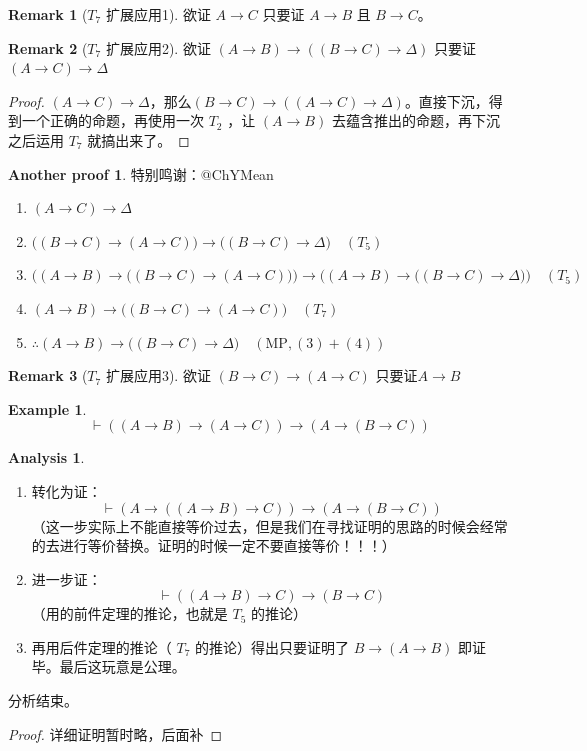 \documentclass[oneside]{book}
\theoremstyle{definition}
\newtheorem{example}{Example}[section]
\newtheorem{remark}{Remark}[section]
\newtheorem*{ap}{Another proof}
\newtheorem*{analysis}{Analysis}
\begin{document}
\begin{remark}[$T_7$ 扩展应用1]
欲证 $A \to C$
	只要证 $A \to B$ 且 $B \to C$。
\end{remark}
\begin{remark}[$T_7$ 扩展应用2]
	欲证 $(A \to B) \to \left( (B \to C) \to \Delta \right)$
	只要证$(A \to C) \to \Delta$
\end{remark}
\begin{proof}
	\((A \to C) \to \Delta\)，那么\((B\to C)\to((A \to C) \to \Delta)\)。直接下沉，得到一个正确的命题，再使用一次 \(T_2\) ，让 \((A\to B)\) 去蕴含推出的命题，再下沉之后运用 \(T_7\) 就搞出来了。
\end{proof}
\begin{ap}
	特别鸣谢：@ChYMean
	\begin{enumerate}
		\item \( (A \to C) \to \Delta \)
		\item \( \big((B \to C) \to (A \to C)\big) \to \big((B \to C) \to \Delta\big) \quad (T_5) \)
		\item \( \Big((A \to B) \to \big((B \to C) \to (A \to C)\big)\Big) \to \Big((A \to B) \to \big((B \to C) \to \Delta\big)\Big) \quad (T_5) \)
		\item \( (A \to B) \to \big((B \to C) \to (A \to C)\big) \quad (T_7) \)
		\item \( \therefore (A \to B) \to \big((B \to C) \to \Delta\big) \quad (\text{MP}, (3)+(4)) \)
	\end{enumerate}
\end{ap}
\begin{remark}[$T_7$ 扩展应用3]
	欲证 $(B \to C) \to (A \to C)$
	只要证$A \to B$
\end{remark}

\begin{example}
	\[
	\vdash \left( (A \to B) \to (A \to C) \right) \to \left( A \to (B \to C) \right)
	\]
\end{example}
\begin{analysis}
	\begin{enumerate}
		\item 转化为证：
		\[
		\vdash \left( A \to \left( (A \to B) \to C \right) \right) \to \left( A \to (B \to C) \right)
		\]
		（这一步实际上不能直接等价过去，但是我们在寻找证明的思路的时候会经常的去进行等价替换。证明的时候一定不要直接等价！！！）
		\item 进一步证：
		\[
		\vdash \left( (A \to B) \to C \right) \to (B \to C)
		\]
		（用的前件定理的推论，也就是 \(T_5\) 的推论）
		\item 再用后件定理的推论（ \(T_7\) 的推论）得出只要证明了 \(B\to(A\to B)\) 即证毕。最后这玩意是公理。
	\end{enumerate}
	分析结束。
\end{analysis}
\begin{proof}
	详细证明暂时略，后面补
	\end{proof}
\end{document}
